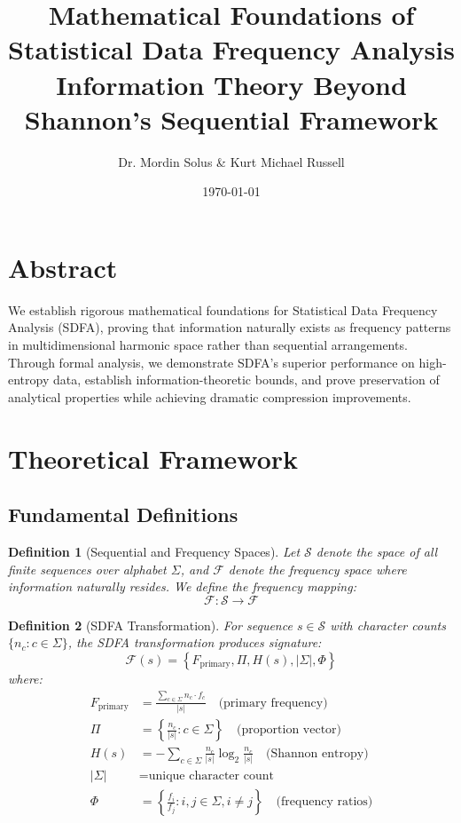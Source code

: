 \documentclass[12pt]{article}
\title{Mathematical Foundations of Statistical Data Frequency Analysis\\
Information Theory Beyond Shannon's Sequential Framework}
\author{Dr. Mordin Solus \& Kurt Michael Russell}
\date{\today}
\newtheorem{definition}{Definition}
\newcommand{\sdfa}{\textsc{SDFA}}
\newcommand{\freqspace}{\mathcal{F}}
\newcommand{\seqspace}{\mathcal{S}}
\newcommand{\Entropy}[1]{H\left(#1\right)}
\newcommand{\FreqMap}{\mathcal{F}}
\begin{document}
\maketitle

\section{Abstract}

We establish rigorous mathematical foundations for Statistical Data Frequency Analysis (\sdfa), proving that information naturally exists as frequency patterns in multidimensional harmonic space rather than sequential arrangements. Through formal analysis, we demonstrate \sdfa's superior performance on high-entropy data, establish information-theoretic bounds, and prove preservation of analytical properties while achieving dramatic compression improvements.

\section{Theoretical Framework}

\subsection{Fundamental Definitions}

\begin{definition}[Sequential and Frequency Spaces]
Let $\seqspace$ denote the space of all finite sequences over alphabet $\Sigma$, and $\freqspace$ denote the frequency space where information naturally resides. We define the frequency mapping:
\begin{equation}
\FreqMap: \seqspace \rightarrow \freqspace
\end{equation}
\end{definition}

\begin{definition}[\sdfa{} Transformation]
For sequence $s \in \seqspace$ with character counts $\{n_c : c \in \Sigma\}$, the \sdfa{} transformation produces signature:
\begin{equation}
\FreqMap(s) = \left\{ F_{\text{primary}}, \Pi, \Entropy{s}, |\Sigma|, \Phi \right\}
\end{equation}
where:
\begin{align}
F_{\text{primary}} &= \frac{\sum_{c \in \Sigma} n_c \cdot f_c}{|s|} \quad \text{(primary frequency)} \\
\Pi &= \left\{ \frac{n_c}{|s|} : c \in \Sigma \right\} \quad \text{(proportion vector)} \\
\Entropy{s} &= -\sum_{c \in \Sigma} \frac{n_c}{|s|} \log_2 \frac{n_c}{|s|} \quad \text{(Shannon entropy)} \\
|\Sigma| &= \text{unique character count} \\
\Phi &= \left\{ \frac{f_i}{f_j} : i,j \in \Sigma, i \neq j \right\} \quad \text{(frequency ratios)}
\end{align}
\end{definition}
\end{document}
